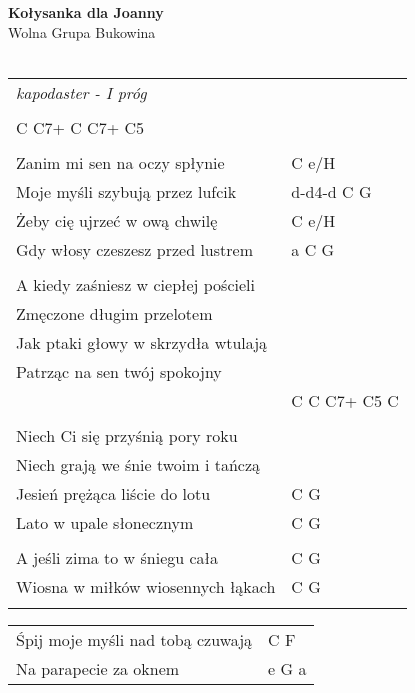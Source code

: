 \documentclass[a5paper]{article}
\begin{document}


\noindent
\fontsize{12pt}{15pt}\selectfont
\textbf{Kołysanka dla Joanny} \\
\fontsize{8pt}{10pt}\selectfont
Wolna Grupa Bukowina \\ \\
\fontsize{10pt}{12pt}\selectfont
{}
\begin{tabular}{@{}p{8.00cm}p{3cm}@{}}
\noindent
\emph{kapodaster - I próg} \\ \\

C C7+ C C7+ C5 \\ \\

Zanim mi sen na oczy spłynie & C e/H \\
Moje myśli szybują przez lufcik & d-d4-d C G \\
Żeby cię ujrzeć w ową chwilę & C e/H \\
Gdy włosy czeszesz przed lustrem & a C G \\ \\

A kiedy zaśniesz w ciepłej pościeli \\
Zmęczone długim przelotem \\
Jak ptaki głowy w skrzydła wtulają \\
Patrząc na sen twój spokojny \\
& C C C7+ C5 C \\ \\

Niech Ci się przyśnią pory roku \\
Niech grają we śnie twoim i tańczą \\
Jesień prężąca liście do lotu & C G \\
Lato w upale słonecznym & C G \\ \\

A jeśli zima to w śniegu cała & C G \\
Wiosna w miłków wiosennych łąkach & C G \\ \\
\end{tabular}

\noindent
\begin{tabular}{@{}p{7.00cm}p{3cm}@{}}
Śpij moje myśli nad tobą czuwają & C F \\
Na parapecie za oknem & e G a
\end{tabular}
\end{document}
